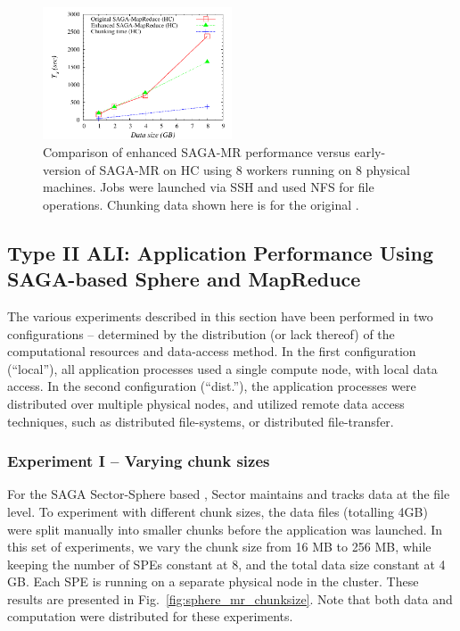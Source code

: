 \documentclass[3p,twocolumn]{elsarticle}
\begin{document}
\begin{figure}[htb!]
 \includegraphics[width=0.5\textwidth]{figures/sagamr_comparison.pdf}
 \caption{Comparison of enhanced SAGA-MR performance versus
   early-version of SAGA-MR on HC using 8 workers running on 8
   physical machines. Jobs were launched via SSH and used NFS for file
   operations. Chunking data shown here is for the original
   \sagamapreduce.} \label{fig:sagamr_comparison}
\end{figure}


\subsection{Type II ALI: Application Performance Using SAGA-based
Sphere and MapReduce}

The various experiments described in this section have been performed
in two configurations -- determined by the distribution (or lack
thereof) of the computational resources and data-access method. In the
first configuration (``local''), all application processes used a
single compute node, with local data access.  In the second
configuration (``dist.''), the application processes were distributed
over multiple physical nodes, and utilized remote data access
techniques, such as distributed file-systems, or distributed
file-transfer. %

\subsubsection{Experiment I -- Varying chunk sizes}

For the SAGA Sector-Sphere based \wc, Sector maintains and tracks data at
the file level. To experiment with different chunk sizes, the data
files (totalling 4GB) were split manually into smaller chunks before
the \wc application was launched. In this set of experiments, we vary
the chunk size from 16 MB to 256 MB, while keeping the number of SPEs
constant at 8, and the total data size constant at 4 GB. Each SPE is
running on a separate physical node in the cluster. These results are
presented in Fig.~\ref{fig:sphere_mr_chunksize}.  Note that both data
and computation were distributed for these experiments.
\end{document}
